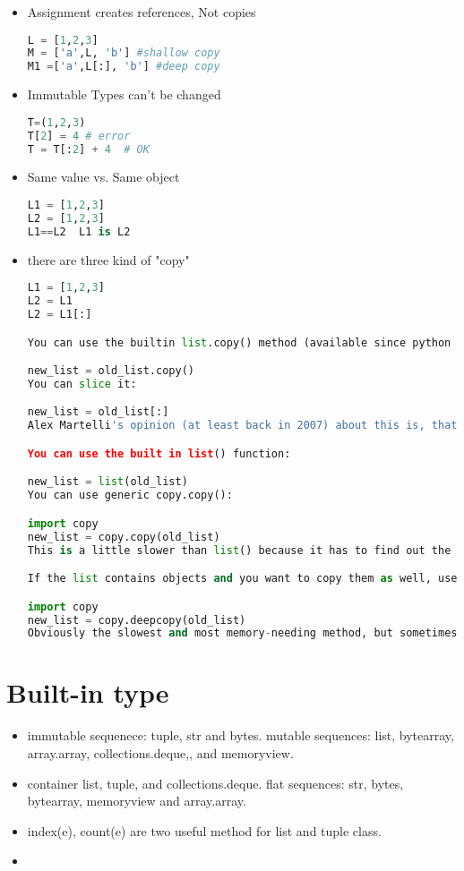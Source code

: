 \documentclass[a4paper,12pt,twoside]{book}
\begin{document}
\begin{itemize}
	\item Assignment creates references, Not copies
\begin{lstlisting}[frame=single, language=Python]
L = [1,2,3]
M = ['a',L, 'b'] #shallow copy
M1 =['a',L[:], 'b'] #deep copy
\end{lstlisting}  
	\item Immutable Types can't be changed
\begin{lstlisting}[frame=single, language=Python]
T=(1,2,3)
T[2] = 4 # error
T = T[:2] + 4  # OK
\end{lstlisting}  
	\item Same value vs. Same object
\begin{lstlisting}[frame=single, language=Python]
L1 = [1,2,3]
L2 = [1,2,3]
L1==L2  L1 is L2
\end{lstlisting}  

\item there are three kind of "copy"
\begin{lstlisting}[frame=single, language=Python]
L1 = [1,2,3]
L2 = L1
L2 = L1[:]

You can use the builtin list.copy() method (available since python 3.3):

new_list = old_list.copy()
You can slice it:

new_list = old_list[:]
Alex Martelli's opinion (at least back in 2007) about this is, that it is a weird syntax and it does not make sense to use it ever. ;) (In his opinion, the next one is more readable).

You can use the built in list() function:

new_list = list(old_list)
You can use generic copy.copy():

import copy
new_list = copy.copy(old_list)
This is a little slower than list() because it has to find out the datatype of old_list first.

If the list contains objects and you want to copy them as well, use generic copy.deepcopy():

import copy
new_list = copy.deepcopy(old_list)
Obviously the slowest and most memory-needing method, but sometimes unavoidable.

\end{lstlisting}  

\end{itemize}

\section{Built-in type}
\begin{itemize}
	\item immutable sequenece: tuple, str and bytes. mutable sequences: list, bytearray, array.array, collections.deque,, and memoryview. 
	
	\item container list, tuple, and collections.deque. flat sequences: str, bytes, bytearray, memoryview and array.array. 
	
	\item index(e), count(e) are two useful method for list and tuple class.
	\item 
\end{itemize}
\end{document}
